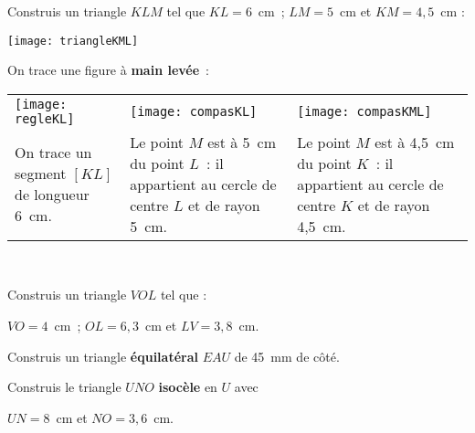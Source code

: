 

\begin{methode*1}

\begin{exemple*1}
Construis un triangle $KLM$ tel que $KL = 6$ cm ; $LM = 5$ cm et $KM = 4,5$ cm :

\begin{center} \texttt{[image: triangleKML]} \end{center}

On trace une figure à \textbf{main levée} :

\begin{tabularx}{\textwidth}{X|X|X}
 \texttt{[image: regleKL]} &  \texttt{[image: compasKL]} & \texttt{[image: compasKML]} \\ 
 On trace un segment $[KL]$ de longueur 6 cm. & Le point $M$ est à 5 cm du point $L$ : il appartient au cercle de centre $L$ et de rayon 5 cm. & Le point $M$ est à 4,5 cm du point $K$ : il appartient au cercle de centre $K$ et de rayon 4,5 cm. \\
\end{tabularx} \\

\end{exemple*1}

\exercice 
Construis un triangle $VOL$ tel que :

$VO = 4$ cm ; $OL = 6,3$ cm et $LV = 3,8$ cm.

\exercice 
Construis un triangle \textbf{équilatéral} $EAU$ de 45 mm de côté.
     
\exercice 
Construis le triangle $UNO$ \textbf{isocèle} en $U$ avec

$UN = 8$ cm et $NO = 3,6$ cm.
 
\end{methode*1}


